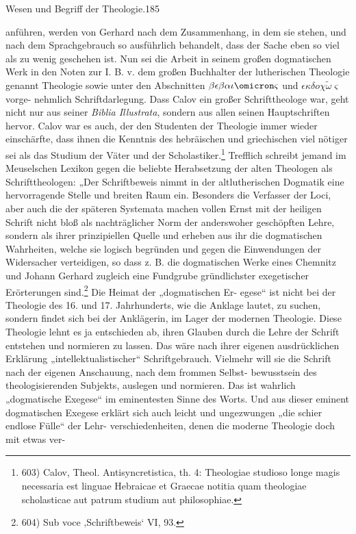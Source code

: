 \noindent Wesen und Begriff der Theologie.\hfill 185
\par
anführen, werden von Gerhard nach dem Zusammenhang, in
dem sie stehen, und nach dem Sprachgebrauch so ausführlich behandelt,
dass der Sache eben so viel als zu wenig geschehen ist. Nun sei
die Arbeit in seinem großen dogmatischen Werk in den Noten zur
I. B. v. dem großen Buchhalter der lutherischen Theologie genannt
Theologie sowie unter den Abschnitten $\beta\epsilon\beta\alpha\iota\omicron\varsigma$ und $\epsilon\kappa\delta o\chi\tilde{\omega}\varsigma$
vorge-
nehmlich Schriftdarlegung. Dass Calov ein großer Schrifttheologe
war, geht nicht nur aus seiner \emph{Biblia Illustrata}, sondern
aus allen seinen Hauptschriften hervor. Calov war es auch, der den
Studenten der Theologie immer wieder einschärfte, dass ihnen die
Kenntnis des hebräischen und griechischen viel nötiger sei als das
Studium der Väter und der Scholastiker.\footnote{603) Calov, Theol. Antisyncretistica, th. 4: Theologiae studioso longe
magis necessaria est linguae Hebraicae et Graecae notitia quam theologiae
scholasticae aut patrum studium aut philosophiae.} Trefflich schreibt jemand
im Meuselschen Lexikon gegen die beliebte Herabsetzung der alten
Theologen als Schrifttheologen: „Der Schriftbeweis nimmt in der
altlutherischen Dogmatik eine hervorragende Stelle und breiten
Raum ein. Besonders die Verfasser der Loci, aber auch die der
späteren Systemata machen vollen Ernst mit der heiligen Schrift
nicht bloß als nachträglicher Norm der anderswoher geschöpften
Lehre, sondern als ihrer prinzipiellen Quelle und erheben
aus ihr die dogmatischen Wahrheiten, welche sie logisch begründen
und gegen die Einwendungen der Widersacher verteidigen, so dass
z. B. die dogmatischen Werke eines Chemnitz und Johann Gerhard
zugleich eine Fundgrube gründlichster exegetischer
Erörterungen sind.\footnote{604) Sub voce ‚Schriftbeweis‘ VI, 93.} Die Heimat der „dogmatischen Er-
egese“ ist nicht bei der Theologie des 16. und 17. Jahrhunderts, wie
die Anklage lautet, zu suchen, sondern findet sich bei der Anklägerin,
im Lager der modernen Theologie. Diese Theologie lehnt es ja
entschieden ab, ihren Glauben durch die Lehre der Schrift entstehen
und normieren zu lassen. Das wäre nach ihrer eigenen ausdrücklichen
Erklärung „intellektualistischer“ Schriftgebrauch. Vielmehr will sie
die Schrift nach der eigenen Anschauung, nach dem frommen Selbst-
bewusstsein des theologisierenden Subjekts, auslegen und normieren.
Das ist wahrlich „dogmatische Exegese“ im eminentesten Sinne des
Worts. Und aus dieser eminent dogmatischen Exegese erklärt sich
auch leicht und ungezwungen „die schier endlose Fülle“ der Lehr-
verschiedenheiten, denen die moderne Theologie doch mit etwas ver-